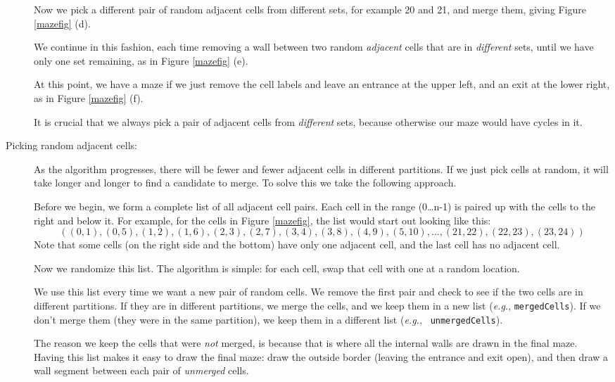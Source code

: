 \documentclass{article}
\begin{document}
\begin{description}
  Now we pick a different pair of random adjacent cells from different
  sets, for example 20 and 21, and merge them, giving Figure
  \ref{mazefig} (d).


  We continue in this fashion, each time removing a wall between two
  random {\em adjacent} cells that are in {\em different} sets, until
  we have only one set remaining, as in Figure \ref{mazefig} (e).  


At this point, we have a maze if we just remove the cell labels
and leave an entrance at the upper left, and an
exit at the lower right, as in Figure \ref{mazefig} (f).
  
It is crucial that we always pick a pair of adjacent cells from {\em
  different} sets, because otherwise our maze would have cycles in it.


\item[Picking random adjacent cells:] As the algorithm progresses,
  there will be fewer and fewer adjacent cells in different
  partitions.  If we just pick cells at random, it will take longer
  and longer to find a candidate to merge.  To solve this we take the
  following approach.

  Before we begin, we form a complete list of all adjacent cell
  pairs.  Each cell in the range (0\ldots n-1) is paired up with the
  cells to the right and below it.  For example, for the cells in
  Figure \ref{mazefig}, the list would start out looking like this:
  \[
  ((0,1), (0,5), (1,2), (1,6), (2,3), (2,7), (3,4), (3,8), (4,9),
  (5,10), \ldots, (21,22), (22,23), (23,24) )
  \]
  Note that some cells (on the right side and the bottom) have only
  one adjacent cell, and the last cell has no adjacent cell.

  Now we randomize this list.  The algorithm is simple:  for each
  cell, swap that cell with one at a random location.

  We use this list every time we want a new pair of random cells.  We
  remove the first pair and check to see if the two cells are in
  different partitions.  If they are in different partitions,
  we merge the cells, and we
  keep them in a new  list ({\em e.g.}, {\tt mergedCells}).
  If we don't merge them (they were in the
  same partition), we keep them in a different list ({\em e.g.}, {\tt
    unmergedCells}). 

  The reason we keep the cells that were {\em not} merged, is because
  that is where all the internal walls are drawn in the final maze.
  Having this list makes it easy to draw the final maze: draw the
  outside border (leaving the entrance and exit open), and then draw a
  wall segment between each pair of {\em unmerged} cells.



\end{description}
\end{document}

